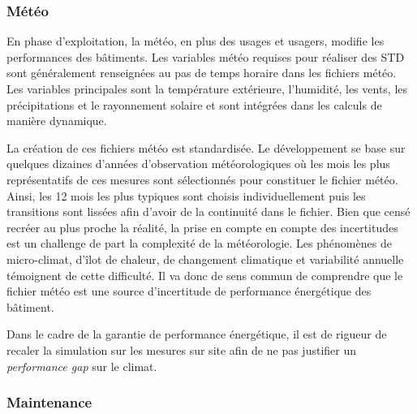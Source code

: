 \subsubsection{Météo}
\label{Météo}

En phase d'exploitation, la météo, en plus des usages et usagers, modifie les performances des bâtiments.  Les variables météo requises pour réaliser des STD sont généralement renseignées au pas de temps horaire dans les fichiers météo. Les variables principales sont la température extérieure, l'humidité, les vents, les précipitations et le rayonnement solaire et sont intégrées dans les calculs de manière dynamique.

La création de ces fichiers météo est standardisée. Le développement se base sur quelques dizaines d'années d'observation météorologiques où les mois les plus représentatifs de ces mesures sont sélectionnés pour constituer le fichier météo. Ainsi, les 12 mois les plus typiques sont choisis individuellement puis les transitions sont lissées afin d'avoir de la continuité dans le fichier. Bien que censé recréer au plus proche la réalité, la prise en compte en compte des incertitudes est un challenge de part la complexité de la météorologie. Les phénomènes de micro-climat, d'îlot de chaleur, de changement climatique et variabilité annuelle témoignent de cette difficulté. Il va donc de sens commun de comprendre que le fichier météo est une source d'incertitude de performance énergétique des bâtiment.

Dans le cadre de la garantie de performance énergétique, il est de rigueur de recaler la simulation sur les mesures sur site afin de ne pas justifier un \textit{performance gap} sur le climat.

\subsubsection{Maintenance}

